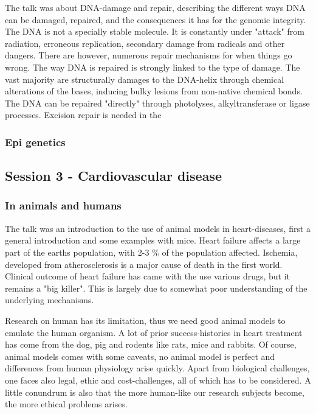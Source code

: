 \documentclass[12p]{article}
\begin{document}
The talk was about DNA-damage and repair, describing the different ways DNA can be damaged, repaired, and the consequences it has for the genomic integrity.
The DNA is not a specially stable molecule.
It is constantly under "attack" from radiation, erroneous replication, secondary damage from radicals and other dangers.
There are however, numerous repair mechanisms for when things go wrong.
The way DNA is repaired is strongly linked to the type of damage.
The vast majority are structurally damages to the DNA-helix through chemical alterations of the bases, inducing bulky lesions from non-native chemical bonds.
The DNA can be repaired "directly" through photolyses, alkyltransferase or ligase processes.
Excision repair is needed in the 

\subsubsection{Epi genetics}


\subsection*{Session 3 - Cardiovascular disease}

\subsubsection{In animals and humans}

The talk was an introduction to the use of animal models in heart-diseases, first a general introduction and some examples with mice.
Heart failure affects a large part of the earths population, with 2-3 \% of the population affected.
Ischemia, developed from atherosclerosis is a major cause of death in the first world.
Clinical outcome of heart failure has came with the use various drugs, but it remains a "big killer".
This is largely due to somewhat poor understanding of the underlying mechanisms.

Research on human has its limitation, thus we need good animal models to emulate the human organism.
A lot of prior success-histories in heart treatment has come from the dog, pig and rodents like rats, mice and rabbits.
Of course, animal models comes with some caveats, no animal model is perfect and differences from human physiology arise quickly.
Apart from biological challenges, one faces also legal, ethic and cost-challenges, all of which has to be considered.
A little conundrum is also that the more human-like our research subjects become, the more ethical problems arises.
\end{document}
